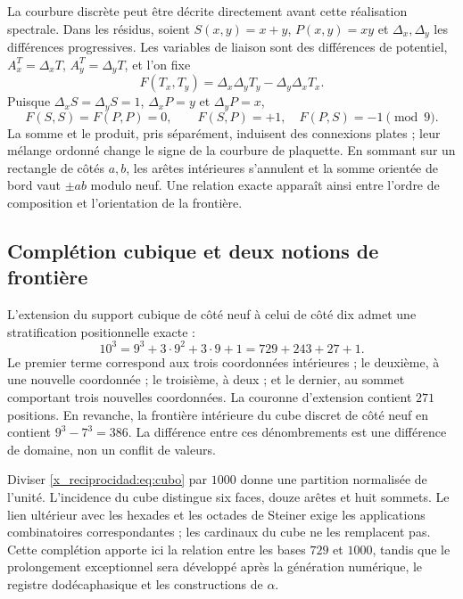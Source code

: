 La courbure discrète peut être décrite directement avant cette réalisation spectrale. Dans les résidus, soient \(S(x,y)=x+y\), \(P(x,y)=xy\) et \(\Delta_x,\Delta_y\) les différences progressives. Les variables de liaison sont des différences de potentiel, \(A_x^T=\Delta_xT\), \(A_y^T=\Delta_yT\), et l’on fixe
\[
 F(T_x,T_y)=\Delta_x\Delta_yT_y-\Delta_y\Delta_xT_x.
\]
Puisque \(\Delta_xS=\Delta_yS=1\), \(\Delta_xP=y\) et \(\Delta_yP=x\),
\begin{equation}
 F(S,S)=F(P,P)=0,\qquad F(S,P)=+1,\quad F(P,S)=-1\pmod9.
\end{equation}
La somme et le produit, pris séparément, induisent des connexions plates ; leur mélange ordonné change le signe de la courbure de plaquette. En sommant sur un rectangle de côtés \(a,b\), les arêtes intérieures s’annulent et la somme orientée de bord vaut \(\pm ab\) modulo neuf. Une relation exacte apparaît ainsi entre l’ordre de composition et l’orientation de la frontière.

\subsection{Complétion cubique et deux notions de frontière}

L’extension du support cubique de côté neuf à celui de côté dix admet une stratification positionnelle exacte :
\begin{equation}
 10^3=9^3+3\cdot9^2+3\cdot9+1=729+243+27+1.
 \label{x_reciprocidad:eq:cubo}
\end{equation}
Le premier terme correspond aux trois coordonnées intérieures ; le deuxième, à une nouvelle coordonnée ; le troisième, à deux ; et le dernier, au sommet comportant trois nouvelles coordonnées. La couronne d’extension contient \(271\) positions. En revanche, la frontière intérieure du cube discret de côté neuf en contient \(9^3-7^3=386\). La différence entre ces dénombrements est une différence de domaine, non un conflit de valeurs.

Diviser \eqref{x_reciprocidad:eq:cubo} par \(1000\) donne une partition normalisée de l’unité. L’incidence du cube distingue six faces, douze arêtes et huit sommets. Le lien ultérieur avec les hexades et les octades de Steiner exige les applications combinatoires correspondantes ; les cardinaux du cube ne les remplacent pas. Cette complétion apporte ici la relation entre les bases \(729\) et \(1000\), tandis que le prolongement exceptionnel sera développé après la génération numérique, le registre dodécaphasique et les constructions de \(\alpha\).


